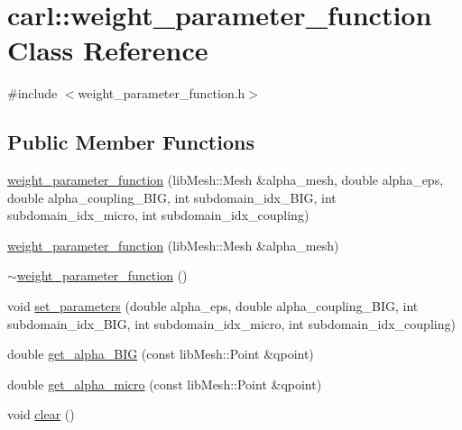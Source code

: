 \hypertarget{classcarl_1_1weight__parameter__function}{}\section{carl\+:\+:weight\+\_\+parameter\+\_\+function Class Reference}
\label{classcarl_1_1weight__parameter__function}


{\ttfamily \#include $<$weight\+\_\+parameter\+\_\+function.\+h$>$}

\subsection*{Public Member Functions}
\begin{DoxyCompactItemize}
\item 
\hyperlink{classcarl_1_1weight__parameter__function_abd2127d8abac16000224bf44029aea71}{weight\+\_\+parameter\+\_\+function} (lib\+Mesh\+::\+Mesh \&alpha\+\_\+mesh, double alpha\+\_\+eps, double alpha\+\_\+coupling\+\_\+\+B\+I\+G, int subdomain\+\_\+idx\+\_\+\+B\+I\+G, int subdomain\+\_\+idx\+\_\+micro, int subdomain\+\_\+idx\+\_\+coupling)
\item 
\hyperlink{classcarl_1_1weight__parameter__function_a02e6652ea86c3818885cc5915849e0ab}{weight\+\_\+parameter\+\_\+function} (lib\+Mesh\+::\+Mesh \&alpha\+\_\+mesh)
\item 
\hyperlink{classcarl_1_1weight__parameter__function_a79ecd61277e7f7212b020c205bd31bf9}{$\sim$weight\+\_\+parameter\+\_\+function} ()
\item 
void \hyperlink{classcarl_1_1weight__parameter__function_ac4186364c5c0ab6bf47dd6ba6cb713da}{set\+\_\+parameters} (double alpha\+\_\+eps, double alpha\+\_\+coupling\+\_\+\+B\+I\+G, int subdomain\+\_\+idx\+\_\+\+B\+I\+G, int subdomain\+\_\+idx\+\_\+micro, int subdomain\+\_\+idx\+\_\+coupling)
\item 
double \hyperlink{classcarl_1_1weight__parameter__function_aecbdc96f22a58c4bfefb01eb49ad6ff3}{get\+\_\+alpha\+\_\+\+B\+I\+G} (const lib\+Mesh\+::\+Point \&qpoint)
\item 
double \hyperlink{classcarl_1_1weight__parameter__function_a04603ae397eb5c61eaa77f1ecf7f6472}{get\+\_\+alpha\+\_\+micro} (const lib\+Mesh\+::\+Point \&qpoint)
\item 
void \hyperlink{classcarl_1_1weight__parameter__function_a0cbcbef51e1e17b420de11cb41f6fe96}{clear} ()
\end{DoxyCompactItemize}
